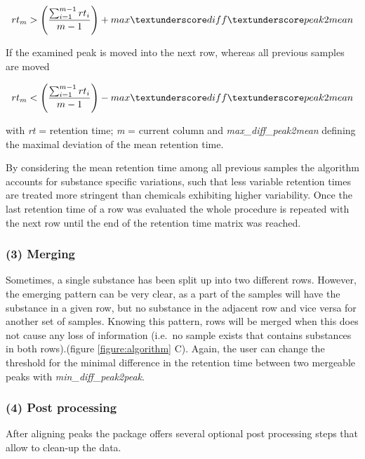 \begin{equation}
rt_{m} > \left(\frac{\sum_{i=1}^{m-1}rt_{i}}{m-1}\right) + max\textunderscore diff\textunderscore peak2mean
\end{equation}

If the examined peak is moved into the next row, whereas all previous
samples are moved

\begin{equation}
rt_{m} < \left(\frac{\sum_{i=1}^{m-1}rt_{i}}{m-1}\right) - max\textunderscore diff\textunderscore peak2mean
\end{equation}

with \emph{rt} = retention time; \emph{m} = current column and
\emph{max\_diff\_peak2mean} defining the maximal deviation of the mean
retention time.

By considering the mean retention time among all previous samples the
algorithm accounts for substance specific variations, such that less
variable retention times are treated more stringent than chemicals
exhibiting higher variability. Once the last retention time of a row was
evaluated the whole procedure is repeated with the next row until the
end of the retention time matrix was reached.

\subsubsection{(3) Merging}\label{merging}

Sometimes, a single substance has been split up into two different rows.
However, the emerging pattern can be very clear, as a part of the
samples will have the substance in a given row, but no substance in the
adjacent row and vice versa for another set of samples. Knowing this
pattern, rows will be merged when this does not cause any loss of
information (i.e.~no sample exists that contains substances in both
rows).(figure \ref{figure:algorithm} C). Again, the user can change the
threshold for the minimal difference in the retention time between two
mergeable peaks with \emph{min\_diff\_peak2peak}. \par 

\subsubsection{(4) Post processing}\label{post-processing}

After aligning peaks the package offers several optional post processing
steps that allow to clean-up the data.


